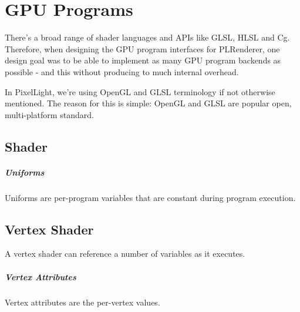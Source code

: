 \chapter{\ac{GPU} Programs}
There's a broad range of shader languages and \ac{API}s like \ac{GLSL}, \ac{HLSL} and Cg. Therefore, when designing the \ac{GPU} program interfaces for PLRenderer, one design goal was to be able to implement as many \ac{GPU} program backends as possible - and this without producing to much internal overhead.

In PixelLight, we're using OpenGL and \ac{GLSL} terminology if not otherwise mentioned. The reason for this is simple: OpenGL and \ac{GLSL} are popular open, multi-platform standard.




\section{Shader}


\paragraph{Uniforms}
Uniforms are per-program variables that are constant during program execution.




\section{Vertex Shader}
A vertex shader can reference a number of variables as it executes.


\paragraph{Vertex Attributes}
Vertex attributes are the per-vertex values.


